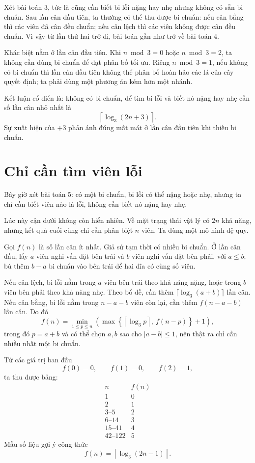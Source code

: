 \documentclass[11pt]{article}
\begin{document}
Xét bài toán 3, tức là cũng cần biết bi lỗi nặng hay nhẹ nhưng không có sẵn
bi chuẩn. Sau lần cân đầu tiên, ta thường có thể thu được bi chuẩn: nếu cân
bằng thì các viên đã cân đều chuẩn; nếu cân lệch thì các viên không được cân
đều chuẩn. Vì vậy từ lần thứ hai trở đi, bài toán gần như trở về bài toán 4.

Khác biệt nằm ở lần cân đầu tiên. Khi \(n\bmod 3=0\) hoặc \(n\bmod 3=2\), ta
không cần dùng bi chuẩn để đạt phân bố tối ưu. Riêng \(n\bmod 3=1\), nếu
không có bi chuẩn thì lần cân đầu tiên không thể phân bố hoàn hảo các lá của
cây quyết định; ta phải dùng một phương án kém hơn một nhánh.

Kết luận cổ điển là: không có bi chuẩn, để tìm bi lỗi và biết nó nặng hay nhẹ
cần số lần cân nhỏ nhất là
\[
  \left\lceil \log_3(2n+3) \right\rceil .
\]
Sự xuất hiện của \(+3\) phản ánh đúng mất mát ở lần cân đầu tiên khi thiếu
bi chuẩn.

\section{Chỉ cần tìm viên lỗi}

Bây giờ xét bài toán 5: có một bi chuẩn, bi lỗi có thể nặng hoặc nhẹ, nhưng
ta chỉ cần biết viên nào là lỗi, không cần biết nó nặng hay nhẹ.

Lúc này cận dưới không còn hiển nhiên. Về mặt trạng thái vật lý có \(2n\) khả
năng, nhưng kết quả cuối cùng chỉ cần phân biệt \(n\) viên. Ta dùng một mô
hình đệ quy.

Gọi \(f(n)\) là số lần cân ít nhất. Giả sử tạm thời có nhiều bi chuẩn. Ở lần
cân đầu, lấy \(a\) viên nghi vấn đặt bên trái và \(b\) viên nghi vấn đặt bên
phải, với \(a\le b\); bù thêm \(b-a\) bi chuẩn vào bên trái để hai đĩa có
cùng số viên.

Nếu cân lệch, bi lỗi nằm trong \(a\) viên bên trái theo khả năng nặng, hoặc
trong \(b\) viên bên phải theo khả năng nhẹ. Theo bổ đề, cần thêm
\(\lceil\log_3(a+b)\rceil\) lần cân. Nếu cân bằng, bi lỗi nằm trong
\(n-a-b\) viên còn lại, cần thêm \(f(n-a-b)\) lần cân. Do đó
\[
  f(n)=\min_{1\le p\le n}
  \left(
    \max\left\{\left\lceil\log_3 p\right\rceil,\ f(n-p)\right\}+1
  \right),
\]
trong đó \(p=a+b\) và có thể chọn \(a,b\) sao cho \(|a-b|\le 1\), nên thật ra
chỉ cần nhiều nhất một bi chuẩn.

Từ các giá trị ban đầu
\[
  f(0)=0,\qquad f(1)=0,\qquad f(2)=1,
\]
ta thu được bảng:
\[
\begin{array}{c|c}
n & f(n)\\ \hline
1 & 0\\
2 & 1\\
3\text{--}5 & 2\\
6\text{--}14 & 3\\
15\text{--}41 & 4\\
42\text{--}122 & 5
\end{array}
\]
Mẫu số liệu gợi ý công thức
\[
  f(n)=\left\lceil \log_3(2n-1) \right\rceil .
\]
\end{document}
